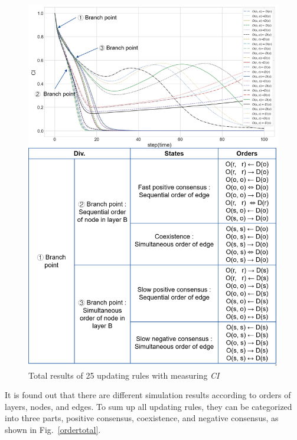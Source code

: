\begin{figure}[!htb]
	\centering
	\includegraphics[width=\hsize]{figure/chap4_ordertotal2.png}
	\caption{Total results of 25 updating rules with measuring \textit{CI}}
	\label{ordertotal2}
\end{figure}

It is found out that there are different simulation results according to orders of layers, nodes, and edges. To sum up all updating rules, they can be categorized into three parts, positive consensus, coexistence, and negative consensus, as shown in Fig.~\ref{ordertotal}. 
 
